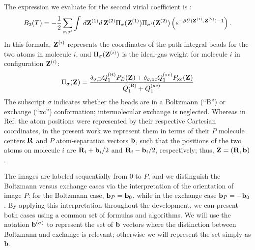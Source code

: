         The expression we evaluate for the second virial coefficient is \cite{Garberoglio2014}:
        \begin{equation}
        \label{eq:B2}
            B_2(T) =  - \frac{1}{2}\sum\limits_{\sigma ,\sigma '} \int \,d {\mathbf {Z}}^{(1)} d\,{\mathbf {Z}}^{(2)} \Pi _\sigma ({\mathbf {Z}}^{(1)}) \Pi _{\sigma '}({\mathbf {Z}}^{(2)}) \left( e^{ - \beta \bar U({\mathbf {Z}}^{(1)} , {\mathbf {Z}}^{(2)}) - 1} \right).
        \end{equation}
        In this formula, ${\mathbf {Z}}^{(i)}$ represents the coordinates of the path-integral beads for the two atoms in molecule $i$, and
        $\Pi_\sigma({\mathbf {Z}}^{(i)})$ is the ideal-gas weight for molecule $i$ in configuration ${\mathbf {Z}}^{(i)}$:
        \begin{equation}
        \label{eq:weight}
            \Pi _\sigma ({\mathbf {Z}}) = \frac{\delta _{\sigma ,{\rm B}} Q_1^{({\rm B})} P_B ({\mathbf {Z}}) + \delta _{\sigma ,{\rm xc}} Q_1^{({\rm xc})} P_{\rm xc} ({\mathbf {Z}})} { Q_1^{({\rm B})} + Q_1^{({\rm xc})}}
        \end{equation}
        The subscript $\sigma$ indicates whether the beads are in a Boltzmann (``B'') or exchange (``xc'') conformation; intermolecular exchange is neglected. Whereas in Ref.  the atom positions were represented by their respective Cartesian coordinates, in the present work we represent them in terms of their $P$ molecule centers ${\mathbf {R}}$ and $P$ atom-separation vectors ${\mathbf {b}}$, such that the positions of the two atoms on molecule $i$ are ${\mathbf {R}}_i+{\mathbf {b}}_i/2$ and ${\mathbf {R}}_i-{\mathbf {b}}_i/2$, respectively; thus, ${\mathbf {Z}} = ({\mathbf {R}},{\mathbf {b}})$.

        The images are labeled sequentially from 0 to $P$, and we distinguish the Boltzmann versus exchange cases via the interpretation of the orientation of image $P$: for the Boltzmann case, ${\mathbf {b}}_P = {\mathbf {b}}_0$, while in the exchange case ${\mathbf {b}}_P = -{\mathbf {b}}_0$. By applying this interpretation throughout the development, we can present both cases using a common set of formulas and algorithms. We will use the notation ${\mathbf {b}}^{(\sigma)}$ to represent the set of ${\mathbf {b}}$ vectors where the distinction between Boltzmann and exchange is relevant; otherwise we will represent the set simply as ${\mathbf {b}}$.

